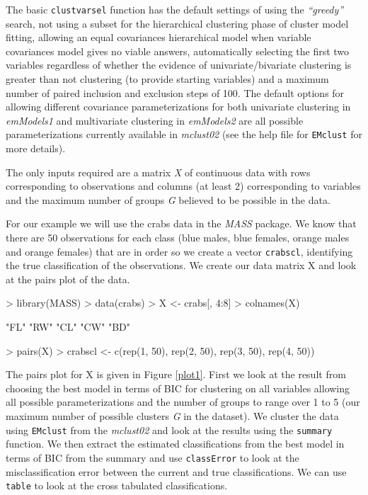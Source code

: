 \documentclass[,12pt]{article}
\newcommand{\Robject}[1]{{\texttt{#1}}}
\newcommand{\Rfunction}[1]{{\texttt{#1}}}
\newcommand{\Rpackage}[1]{{\textit{#1}}}
\newcommand{\Rfunarg}[1]{{\textit{#1}}}
\begin{document}
The basic \Rfunction{clustvarsel}  function has the default settings of using the \Rfunarg{``greedy''} search, not using a subset for the hierarchical clustering phase of cluster model fitting, allowing an equal covariances hierarchical model when variable covariances model gives no viable answers, automatically selecting the first two variables regardless of whether the evidence of univariate/bivariate clustering is greater than not clustering (to provide starting variables) and a maximum number of paired inclusion and exclusion steps of 100. The default options for allowing different covariance parameterizations for both univariate clustering in \Rfunarg{emModels1} and multivariate clustering in \Rfunarg{emModels2} are all possible parameterizations currently available in \Rpackage{mclust02} (see the help file for \Rfunction{EMclust} for more details).

The only inputs required are a matrix \Rfunarg{X} of continuous data with rows corresponding to observations and columns (at least 2) corresponding to variables and the maximum number of groups \Rfunarg{G} believed to be possible in the data.

For our example we will use the crabs data in the \Rpackage{MASS} package. We know that there are 50 observations for each class (blue males, blue females, orange males and orange females) that are in order so we create a vector \Robject{crabscl}, identifying the true classification of the observations. We create our data matrix X and look at the pairs plot of the data.

\begin{Schunk}
\begin{Sinput}
> library(MASS)
> data(crabs)
> X <- crabs[, 4:8]
> colnames(X)
\end{Sinput}
\begin{Soutput}
[1] "FL" "RW" "CL" "CW" "BD"
\end{Soutput}
\begin{Sinput}
> pairs(X)
> crabscl <- c(rep(1, 50), rep(2, 50), rep(3, 50), rep(4, 50))
\end{Sinput}
\end{Schunk}
The pairs plot for X is given in Figure \ref{plot1}.
First we look at the result from choosing the best model in terms of BIC for clustering on all variables allowing all possible parameterizations and the number of groups to range over 1 to 5 (our maximum number of possible clusters \Rfunarg{G} in the dataset). We cluster the data using \Rfunction{EMclust} from the \Rpackage{mclust02} and look at the results using the \Rfunction{summary} function. We then extract the estimated classifications from the best model in terms of BIC from the summary and use \Rfunction{classError} to look at the misclassification error between the current and true classifications. We can use \Rfunction{table} to look at the cross tabulated classifications.
 
\end{document}
